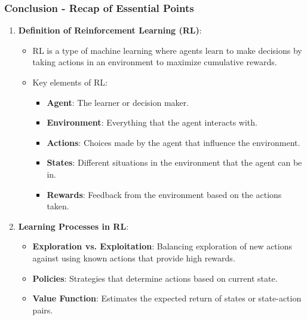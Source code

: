 \documentclass{beamer}
\begin{document}
\begin{frame}[fragile]
    \frametitle{Conclusion - Recap of Essential Points}
    \begin{enumerate}
        \item \textbf{Definition of Reinforcement Learning (RL)}:
            \begin{itemize}
                \item RL is a type of machine learning where agents learn to make decisions by taking actions in an environment to maximize cumulative rewards.
                \item Key elements of RL:
                    \begin{itemize}
                        \item \textbf{Agent}: The learner or decision maker.
                        \item \textbf{Environment}: Everything that the agent interacts with.
                        \item \textbf{Actions}: Choices made by the agent that influence the environment.
                        \item \textbf{States}: Different situations in the environment that the agent can be in.
                        \item \textbf{Rewards}: Feedback from the environment based on the actions taken.
                    \end{itemize}
            \end{itemize}
        
        \item \textbf{Learning Processes in RL}:
            \begin{itemize}
                \item \textbf{Exploration vs. Exploitation}: Balancing exploration of new actions against using known actions that provide high rewards.
                \item \textbf{Policies}: Strategies that determine actions based on current state.
                \item \textbf{Value Function}: Estimates the expected return of states or state-action pairs.
            \end{itemize}
    \end{enumerate}
\end{frame}
\end{document}
